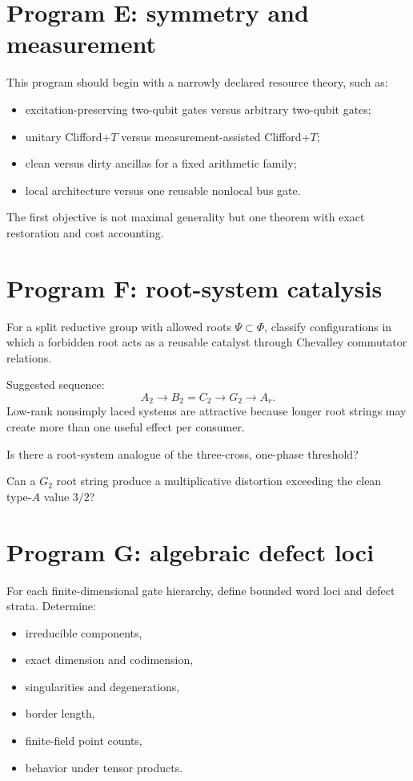 \section{Program E: symmetry and measurement}
This program should begin with a narrowly declared resource theory, such as:
\begin{itemize}
\item excitation-preserving two-qubit gates versus arbitrary two-qubit gates;
\item unitary Clifford+$T$ versus measurement-assisted Clifford+$T$;
\item clean versus dirty ancillas for a fixed arithmetic family;
\item local architecture versus one reusable nonlocal bus gate.
\end{itemize}
The first objective is not maximal generality but one theorem with exact restoration and cost accounting.

\section{Program F: root-system catalysis}
For a split reductive group with allowed roots $\Psi\subset\Phi$, classify configurations in which a forbidden root acts as a reusable catalyst through Chevalley commutator relations.

Suggested sequence:
\[
A_2\to B_2=C_2\to G_2\to A_r.
\]
Low-rank nonsimply laced systems are attractive because longer root strings may create more than one useful effect per consumer.

\begin{question}
Is there a root-system analogue of the three-cross, one-phase threshold?
\end{question}
\begin{question}
Can a $G_2$ root string produce a multiplicative distortion exceeding the clean type-$A$ value $3/2$?
\end{question}

\section{Program G: algebraic defect loci}
For each finite-dimensional gate hierarchy, define bounded word loci and defect strata.  Determine:
\begin{itemize}
\item irreducible components,
\item exact dimension and codimension,
\item singularities and degenerations,
\item border length,
\item finite-field point counts,
\item behavior under tensor products.
\end{itemize}


